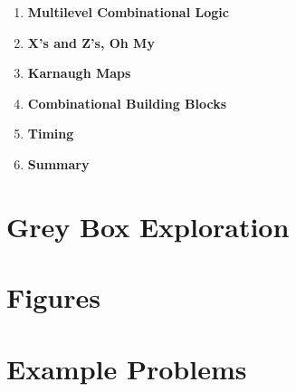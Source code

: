 \documentclass[12pt]{article}
\begin{document}
\begin{enumerate}
    \item \textbf{Multilevel Combinational Logic}

    \item \textbf{X's and Z's, Oh My}

    \item \textbf{Karnaugh Maps}

    \item \textbf{Combinational Building Blocks}

    \item \textbf{Timing}

    \item \textbf{Summary}

\end{enumerate}

\section{Grey Box Exploration}

\section{Figures}

\section{Example Problems}
\end{document}
